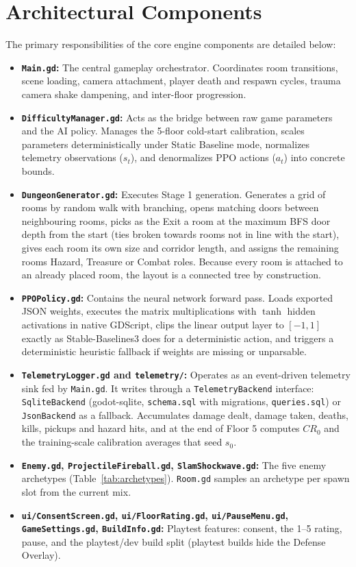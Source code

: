 \section{Architectural Components}
The primary responsibilities of the core engine components are detailed below:
\begin{itemize}
    \item \textbf{\texttt{Main.gd}:} The central gameplay orchestrator. Coordinates room transitions, scene loading, camera attachment, player death and respawn cycles, trauma camera shake dampening, and inter-floor progression.
    \item \textbf{\texttt{DifficultyManager.gd}:} Acts as the bridge between raw game parameters and the AI policy. Manages the 5-floor cold-start calibration, scales parameters deterministically under Static Baseline mode, normalizes telemetry observations ($s_t$), and denormalizes PPO actions ($a_t$) into concrete bounds.
    \item \textbf{\texttt{DungeonGenerator.gd}:} Executes Stage 1 generation. Generates a grid of rooms by random walk with branching, opens matching doors between neighbouring rooms, picks as the Exit a room at the maximum BFS door depth from the start (ties broken towards rooms not in line with the start), gives each room its own size and corridor length, and assigns the remaining rooms Hazard, Treasure or Combat roles. Because every room is attached to an already placed room, the layout is a connected tree by construction.
    \item \textbf{\texttt{PPOPolicy.gd}:} Contains the neural network forward pass. Loads exported JSON weights, executes the matrix multiplications with $\tanh$ hidden activations in native GDScript, clips the linear output layer to $[-1,1]$ exactly as Stable-Baselines3 does for a deterministic action, and triggers a deterministic heuristic fallback if weights are missing or unparsable.
    \item \textbf{\texttt{TelemetryLogger.gd} and \texttt{telemetry/}:} Operates as an event-driven telemetry sink fed by \texttt{Main.gd}. It writes through a \texttt{TelemetryBackend} interface: \texttt{SqliteBackend} (godot-sqlite, \texttt{schema.sql} with migrations, \texttt{queries.sql}) or \texttt{JsonBackend} as a fallback. Accumulates damage dealt, damage taken, deaths, kills, pickups and hazard hits, and at the end of Floor 5 computes $CR_0$ and the training-scale calibration averages that seed $s_0$.
    \item \textbf{\texttt{Enemy.gd}, \texttt{ProjectileFireball.gd}, \texttt{SlamShockwave.gd}:} The five enemy archetypes (Table~\ref{tab:archetypes}). \texttt{Room.gd} samples an archetype per spawn slot from the current mix.
    \item \textbf{\texttt{ui/ConsentScreen.gd}, \texttt{ui/FloorRating.gd}, \texttt{ui/PauseMenu.gd}, \texttt{GameSettings.gd}, \texttt{BuildInfo.gd}:} Playtest features: consent, the 1--5 rating, pause, and the playtest/dev build split (playtest builds hide the Defense Overlay).
\end{itemize}

